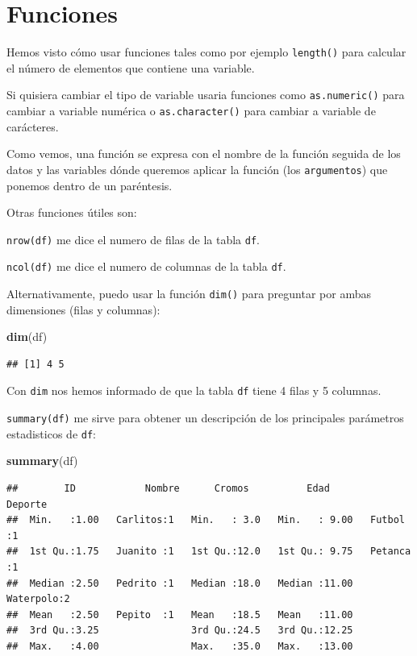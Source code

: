 \documentclass[]{book}
\newenvironment{Shaded}{\begin{snugshade}}{\end{snugshade}}
\newcommand{\KeywordTok}[1]{\textcolor[rgb]{0.13,0.29,0.53}{\textbf{#1}}}
\newcommand{\NormalTok}[1]{#1}
\theoremstyle{definition}
\theoremstyle{definition}
\theoremstyle{definition}
\theoremstyle{remark}
\begin{document}
\hypertarget{funciones}{%
\section{Funciones}\label{funciones}}

Hemos visto cómo usar funciones tales como por ejemplo \texttt{length()}
para calcular el número de elementos que contiene una variable.

Si quisiera cambiar el tipo de variable usaria funciones como
\texttt{as.numeric()} para cambiar a variable numérica o
\texttt{as.character()} para cambiar a variable de carácteres.

Como vemos, una función se expresa con el nombre de la función seguida
de los datos y las variables dónde queremos aplicar la función (los
\texttt{argumentos}) que ponemos dentro de un paréntesis.

Otras funciones útiles son:

\texttt{nrow(df)} me dice el numero de filas de la tabla \texttt{df}.

\texttt{ncol(df)} me dice el numero de columnas de la tabla \texttt{df}.

Alternativamente, puedo usar la función \texttt{dim()} para preguntar
por ambas dimensiones (filas y columnas):

\begin{Shaded}
\begin{Highlighting}[]
\KeywordTok{dim}\NormalTok{(df)}
\end{Highlighting}
\end{Shaded}

\begin{verbatim}
## [1] 4 5
\end{verbatim}

Con \texttt{dim} nos hemos informado de que la tabla \texttt{df} tiene 4
filas y 5 columnas.

\texttt{summary(df)} me sirve para obtener un descripción de los
principales parámetros estadisticos de \texttt{df}:

\begin{Shaded}
\begin{Highlighting}[]
\KeywordTok{summary}\NormalTok{(df)}
\end{Highlighting}
\end{Shaded}

\begin{verbatim}
##        ID            Nombre      Cromos          Edad            Deporte 
##  Min.   :1.00   Carlitos:1   Min.   : 3.0   Min.   : 9.00   Futbol   :1  
##  1st Qu.:1.75   Juanito :1   1st Qu.:12.0   1st Qu.: 9.75   Petanca  :1  
##  Median :2.50   Pedrito :1   Median :18.0   Median :11.00   Waterpolo:2  
##  Mean   :2.50   Pepito  :1   Mean   :18.5   Mean   :11.00                
##  3rd Qu.:3.25                3rd Qu.:24.5   3rd Qu.:12.25                
##  Max.   :4.00                Max.   :35.0   Max.   :13.00
\end{verbatim}
\end{document}
